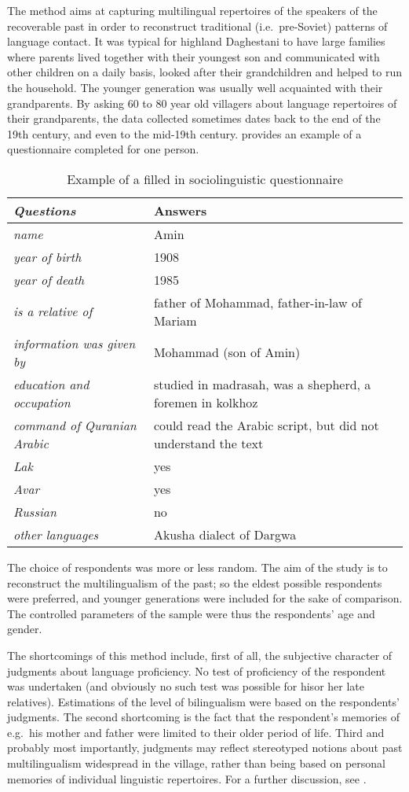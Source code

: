 \documentclass[output=paper]{langsci/langscibook}
\begin{document}
The method aims at capturing multilingual repertoires of the speakers of
the recoverable past in order to reconstruct traditional (i.e.\
pre-Soviet) patterns of language contact. It was typical for highland
Daghestani to have large families where parents lived together with
their youngest son and communicated with other children on a daily
basis, looked after their grandchildren and helped to run the household.
The younger generation was usually well acquainted with their
grandparents. By asking 60 to 80 year old villagers about language
repertoires of their grandparents, the data collected sometimes dates
back to the end of the 19th century, and even to the mid-19th century.
\tabref{Table1} provides an example of a questionnaire completed for one person.

\begin{table}[ht]
\begin{tabularx}{\textwidth}{@{}p{}X@{}}
\toprule
\emph{Questions} & {Answers}\tabularnewline \midrule 
\emph{name} & Amin\tabularnewline
\emph{year of birth} & 1908\tabularnewline
\emph{year of death} & 1985\tabularnewline
\emph{is a relative of} & father of Mohammad, father-in-law of
Mariam\tabularnewline
\emph{information was given by} & Mohammad (son of Amin)\tabularnewline
\emph{education and occupation} & studied in madrasah, was a shepherd, a
foremen in kolkhoz\tabularnewline
\emph{command of Quranian Arabic} & could read the Arabic script, but
did not understand the text\tabularnewline
\emph{Lak} & yes\tabularnewline
\emph{Avar} & yes\tabularnewline
\emph{Russian} & no\tabularnewline
\emph{other languages} & Akusha dialect of Dargwa\tabularnewline
\bottomrule
\end{tabularx}

\caption{Example of a filled in sociolinguistic questionnaire}
\label{Table1}
\end{table}

The choice of respondents was more or less random. The aim of the study
is to reconstruct the multilingualism of the past; so the eldest
possible respondents were preferred, and younger generations were
included for the sake of comparison. The controlled parameters of the
sample were thus the respondents' age and gender.

The shortcomings of this method include, first of all, the subjective
character of judgments about language proficiency. No test of
proficiency of the respondent was undertaken (and obviously no such test was
possible for his\pagebreak[4] or her late relatives). Estimations of the level of
bilingualism were based on the respondents' judgments. The second
shortcoming is the fact that the respondent's memories of e.g.\ his
mother and father were limited to their older period of life.
Third and probably most importantly, judgments may reflect stereotyped
notions about past multilingualism widespread in the village, rather
than being based on personal memories of individual linguistic repertoires.
For a further discussion, see \citet{dobrushina2013}.
\end{document}
